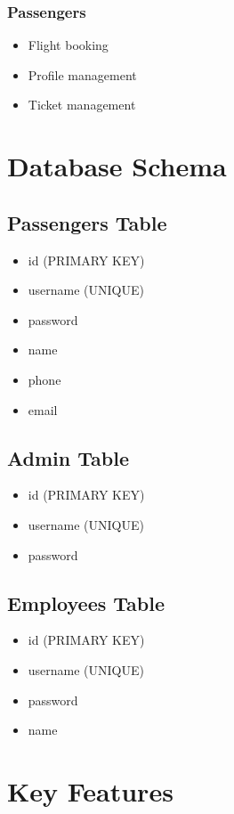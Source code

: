 \documentclass{article}
\begin{document}
\subsubsection{Passengers}
\begin{itemize}
    \item Flight booking
    \item Profile management
    \item Ticket management
\end{itemize}

\section{Database Schema}
\subsection{Passengers Table}
\begin{itemize}
    \item id (PRIMARY KEY)
    \item username (UNIQUE)
    \item password
    \item name
    \item phone
    \item email
\end{itemize}

\subsection{Admin Table}
\begin{itemize}
    \item id (PRIMARY KEY)
    \item username (UNIQUE)
    \item password
\end{itemize}

\subsection{Employees Table}
\begin{itemize}
    \item id (PRIMARY KEY)
    \item username (UNIQUE)
    \item password
    \item name
\end{itemize}

\section{Key Features}
\end{document}
